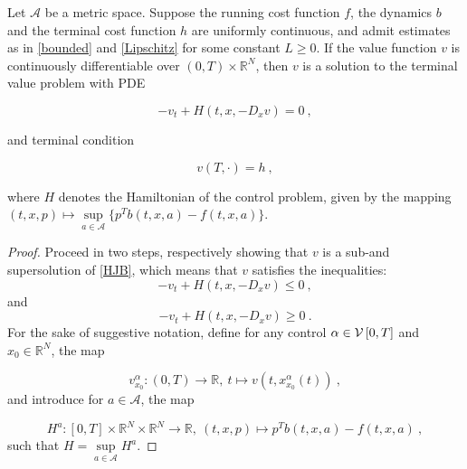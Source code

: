 

\begin{theorem}
	\label{classical solution HJB}
	Let $ \mathcal{A} $ be a metric space. Suppose the running cost function $ f $, the dynamics $ b $ and the terminal cost function $ h $ are uniformly continuous, and admit estimates as in \eqref{bounded} and \eqref{Lipschitz} for some constant $ L \geq 0 $. If the value function $ v $ is continuously differentiable over $ \left( 0, T \right) \times \mathbb{R}^N $, then $ v $ is a solution to the terminal value problem with PDE
	
	\begin{equation}
		\label{HJB}
		-v_t + H(t, x, -D_x v) = 0 \ ,
	\end{equation}
	
	and terminal condition
	
	\begin{equation}
		\label{boundary}
		v(T, \cdot) = h \ ,
	\end{equation}
	
	where $ H $ denotes the Hamiltonian of the control problem, given by the mapping $ (t, x, p) \mapsto \sup\limits_{a \in \mathcal{A}} \bigg\{ p^{T} b(t, x, a) - f(t, x, a) \bigg\} $.
	\begin{proof}
		Proceed in two steps, respectively showing that $ v $ is a sub-and supersolution of \eqref{HJB}, which means that $ v $ satisfies the inequalities:
		\begin{equation}
			\label{value_subsolution}
			-v_t + H(t, x, -D_x v) \leq 0 \ ,
		\end{equation}
		and 
		\begin{equation}
			\label{value_supersolution}
			-v_t + H(t, x, - D_x v) \geq 0 \ .
		\end{equation}
		For the sake of suggestive notation, define for any control $ \alpha \in \mathcal{V}\left[ {0}, T \right] $ and $ x_0 \in \mathbb{R}^N $, the map
		
		\begin{equation*}
			v^{\alpha}_{x_0} : \left( 0 , T \right) \to \mathbb{R}, \ t \mapsto v(t, x^{\alpha}_{x_0}(t)) \ ,
		\end{equation*}
		and introduce for $ a \in \mathcal{A} $, the map
		
		\begin{equation*}
			H^{a} : \left[ 0, T \right] \times \mathbb{R}^{N} \times \mathbb{R}^N \to \mathbb{R}, \ (t, x, p) \mapsto p^{T} b(t, x, a) - f(t, x, a) \ ,
		\end{equation*}
		such that $ H = \sup\limits_{a \in \mathcal{A}} H^{a} $.
		

\end{proof}
\end{theorem}
